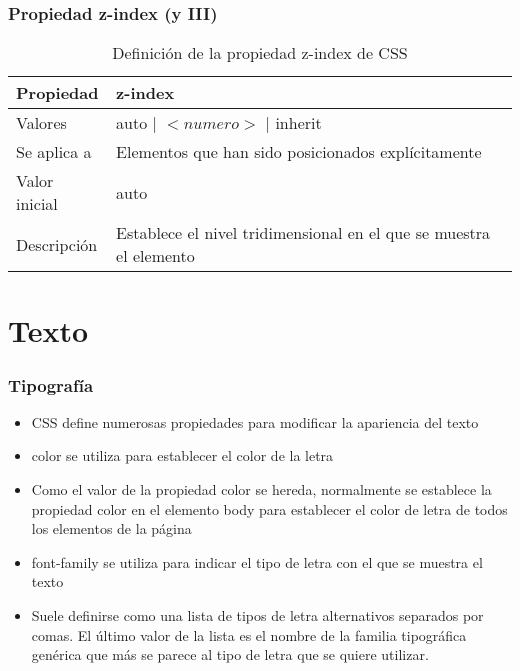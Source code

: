 
\begin{frame}
\frametitle{Propiedad z-index (y III)}

\begin{center}
  \begin{table}
   \begin{tabular}{p{1.8cm}p{7.8cm}}
Propiedad & \bf{z-index} \\ \hline
Valores& auto | $<numero>$ | inherit \\ \hline
Se aplica a& Elementos que han sido posicionados explícitamente \\ \hline
Valor inicial& auto \\ \hline
Descripción& Establece el nivel tridimensional en el que se muestra el elemento \\ \hline
  \end{tabular}
   \caption{Definición de la propiedad z-index de CSS}
 \end{table}
\end{center}


\end{frame}


\section{Texto}

\begin{frame}
\frametitle{Tipografía}

\begin{itemize}
  \item CSS define numerosas propiedades para modificar la apariencia del texto
  \item color se utiliza para establecer el color de la letra
  \item Como el valor de la propiedad color se hereda, normalmente se establece la propiedad color en el elemento body para establecer el color de letra de todos los elementos de la página
 \item font-family se utiliza para indicar el tipo de letra con el que se muestra el texto
  \item Suele definirse como una lista de tipos de letra alternativos separados por comas. El último valor de la lista es el nombre de la familia tipográfica genérica que más se parece al tipo de letra que se quiere utilizar.
\end{itemize}

\end{frame}


